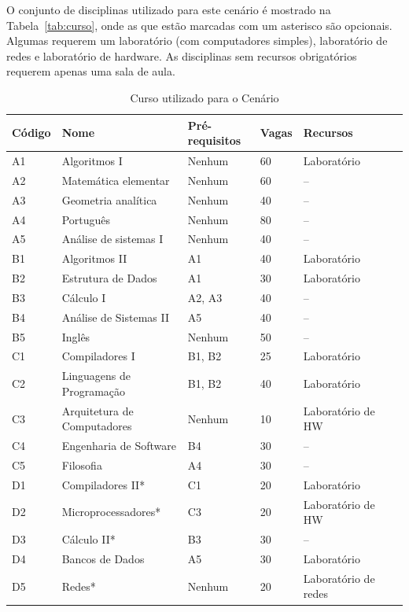 O conjunto de disciplinas utilizado para este cenário é mostrado na Tabela~\ref{tab:curso}, onde as que estão marcadas com um asterisco são opcionais. Algumas requerem um laboratório (com computadores simples), laboratório de redes e laboratório de hardware. As disciplinas sem recursos obrigatórios requerem apenas uma sala de aula.

\begin{table}\centering\footnotesize
  \caption{Curso utilizado para o Cenário}
  \begin{tabular*}{1\textwidth}{@{}lllllll@{}}
    \toprule
    Código & Nome & Pré-requisitos & Vagas & Recursos \\
    \midrule
    A1 & Algoritmos I           & Nenhum & 60 & Laboratório \\
    A2 & Matemática elementar   & Nenhum & 60 & -- \\
    A3 & Geometria analítica    & Nenhum & 40 & -- \\
    A4 & Português              & Nenhum & 80 & -- \\
    A5 & Análise de sistemas I  & Nenhum & 40 & -- \\
    \midrule
    B1 & Algoritmos II          & A1 & 40 & Laboratório \\
    B2 & Estrutura de Dados     & A1 & 30 & Laboratório \\
    B3 & Cálculo I              & A2, A3 & 40 & -- \\
    B4 & Análise de Sistemas II & A5 & 40 & -- \\
    B5 & Inglês                 & Nenhum & 50 & -- \\
    \midrule
    C1 & Compiladores I         & B1, B2 & 25 & Laboratório \\
    C2 & Linguagens de Programação & B1, B2 & 40 & Laboratório \\
    C3 & Arquitetura de Computadores & Nenhum & 10 & Laboratório de HW \\
    C4 & Engenharia de Software & B4 & 30 & -- \\
    C5 & Filosofia              & A4 & 30 & -- \\
    \midrule
    D1 & Compiladores II*       & C1 & 20 & Laboratório \\
    D2 & Microprocessadores*    & C3 & 20 & Laboratório de HW \\
    D3 & Cálculo II*            & B3 & 30 & -- \\
    D4 & Bancos de Dados        & A5 & 30 & Laboratório \\
    D5 & Redes*                 & Nenhum & 20 & Laboratório de redes \\

\end{tabular*}
\end{table}
